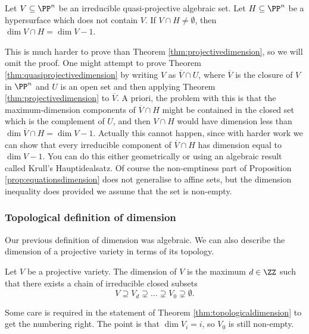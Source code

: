 \pagebreak

\begin{theorem}
\label{thm:quasiprojectivedimension}
Let $ V \subseteq \PP^n $ be an irreducible quasi-projective algebraic set. Let $ H \subseteq \PP^n $ be a hypersurface which does not contain $ V $. If $ V \cap H \ne \emptyset $, then $ \dim V \cap H = \dim V - 1 $.
\end{theorem}

This is much harder to prove than Theorem \ref{thm:projectivedimension}, so we will omit the proof. One might attempt to prove Theorem \ref{thm:quasiprojectivedimension} by writing $ V $ as $ \overline{V} \cap U $, where $ \overline{V} $ is the closure of $ V $ in $ \PP^n $ and $ U $ is an open set and then applying Theorem \ref{thm:projectivedimension} to $ \overline{V} $. A priori, the problem with this is that the maximum-dimension components of $ \overline{V} \cap H $ might be contained in the closed set which is the complement of $ U $, and then $ V \cap H $ would have dimension less than $ \dim \overline{V} \cap H = \dim V - 1 $. Actually this cannot happen, since with harder work we can show that every irreducible component of $ \overline{V} \cap H $ has dimension equal to $ \dim V - 1 $. You can do this either geometrically or using an algebraic result called Krull's Hauptidealsatz. Of course the non-emptiness part of Proposition \ref{prop:equationsdimension} does not generalise to affine sets, but the dimension inequality does provided we assume that the set is non-empty.

\subsubsection{Topological definition of dimension}


Our previous definition of dimension was algebraic. We can also describe the dimension of a projective variety in terms of its topology.

\begin{theorem}
\label{thm:topologicaldimension}
Let $ V $ be a projective variety. The dimension of $ V $ is the maximum $ d \in \ZZ $ such that there exists a chain of irreducible closed subsets
$$ V \supseteq V_d \supsetneq \dots \supsetneq V_0 \supsetneq \emptyset. $$
\end{theorem}

Some care is required in the statement of Theorem \ref{thm:topologicaldimension} to get the numbering right. The point is that $ \dim V_i = i $, so $ V_0 $ is still non-empty.

